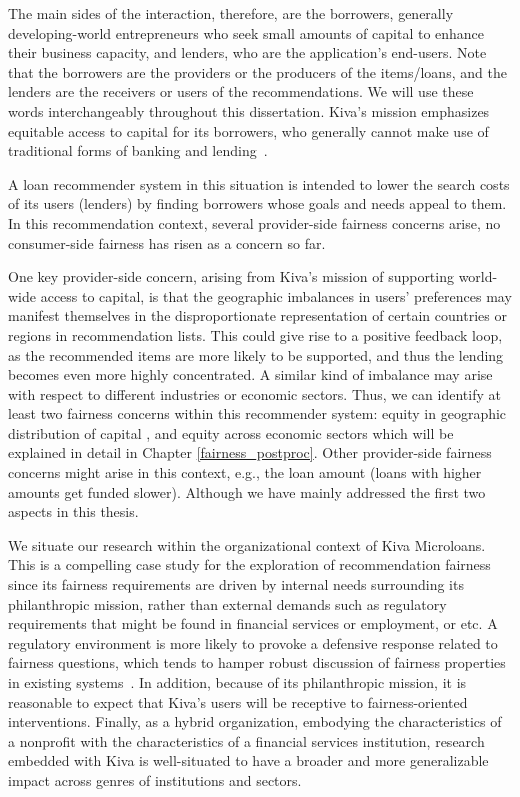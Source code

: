     The main sides of the interaction, therefore, are the borrowers, generally developing-world entrepreneurs who seek small amounts of capital to enhance their business capacity, and lenders, who are the application's end-users. Note that the borrowers are the providers or the producers of the items/loans, and the lenders are the receivers or users of the recommendations. We will use these words interchangeably throughout this dissertation. Kiva's mission emphasizes equitable access to capital for its borrowers, who generally cannot make use of traditional forms of banking and lending~\cite{Choo_understanding_kiva}.
    
    
    A loan recommender system in this situation is intended to lower the search costs of its users (lenders) by finding borrowers whose goals and needs appeal to them. In this recommendation context, several provider-side fairness concerns arise, no consumer-side fairness has risen as a concern so far. 
    
    One key provider-side concern, arising from Kiva's mission of supporting world-wide access to capital, is that the geographic imbalances in users' preferences may manifest themselves in the disproportionate representation of certain countries or regions in recommendation lists. This could give rise to a positive feedback loop, as the recommended items are more likely to be supported, and thus the lending becomes even more highly concentrated. A similar kind of imbalance may arise with respect to different industries or economic sectors. Thus, we can identify at least two fairness concerns within this recommender system: equity in geographic distribution of capital \cite{liu2019personalized}, and equity across economic sectors \cite{sonboli2020opportunistic} which will be explained in detail in Chapter \ref{fairness_postproc}. Other provider-side fairness concerns might arise in this context, e.g., the loan amount (loans with higher amounts get funded slower). Although we have mainly addressed the first two aspects in this thesis.
    
    
    We situate our research within the organizational context of Kiva Microloans. This is a compelling case study for the exploration of recommendation fairness since its fairness requirements are driven by internal needs surrounding its philanthropic mission, rather than external demands such as regulatory requirements that might be found in financial services or employment, or etc. A regulatory environment is more likely to provoke a defensive response related to fairness questions, which tends to hamper robust discussion of fairness properties in existing systems~\cite{chen2018fair,holstein2019improving}. In addition, because of its philanthropic mission, it is reasonable to expect that Kiva's users will be receptive to fairness-oriented interventions. Finally, as a hybrid organization, embodying the characteristics of a nonprofit with the characteristics of a financial services institution, research embedded with Kiva is well-situated to have a broader and more generalizable impact across genres of institutions and sectors.

